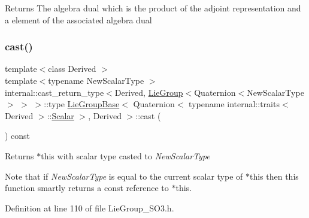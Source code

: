 \begin{DoxyReturn}{Returns}
The algebra dual which is the product of the adjoint representation and a element of the associated algebra dual 
\end{DoxyReturn}
\hypertarget{class_lie_group_base_3_01_quaternion_3_01typename_01internal_1_1traits_3_01_derived_01_4_1_1_scalar_01_4_00_01_derived_01_4_a77df9c20648ef1800b3e46cc2dc4c71c}{}\label{class_lie_group_base_3_01_quaternion_3_01typename_01internal_1_1traits_3_01_derived_01_4_1_1_scalar_01_4_00_01_derived_01_4_a77df9c20648ef1800b3e46cc2dc4c71c} 
\subsubsection{\texorpdfstring{cast()}{cast()}}
{\footnotesize\ttfamily template$<$class Derived $>$ \\
template$<$typename New\+Scalar\+Type $>$ \\
internal\+::cast\+\_\+return\+\_\+type$<$Derived, \hyperlink{class_lie_group}{Lie\+Group}$<$Quaternion$<$New\+Scalar\+Type$>$ $>$ $>$\+::type \hyperlink{class_lie_group_base}{Lie\+Group\+Base}$<$ Quaternion$<$ typename internal\+::traits$<$ Derived $>$\+::\hyperlink{class_lie_group_base_3_01_quaternion_3_01typename_01internal_1_1traits_3_01_derived_01_4_1_1_scalar_01_4_00_01_derived_01_4_afadeceb3b98e52deecc572e71efb82a8}{Scalar} $>$, Derived $>$\+::cast (\begin{DoxyParamCaption}{ }\end{DoxyParamCaption}) const\hspace{0.3cm}{\ttfamily [inline]}}

\begin{DoxyReturn}{Returns}
{\ttfamily $\ast$this} with scalar type casted to {\itshape New\+Scalar\+Type} 
\end{DoxyReturn}
Note that if {\itshape New\+Scalar\+Type} is equal to the current scalar type of {\ttfamily $\ast$this} then this function smartly returns a const reference to {\ttfamily $\ast$this}. 

Definition at line 110 of file Lie\+Group\+\_\+\+S\+O3.\+h.

